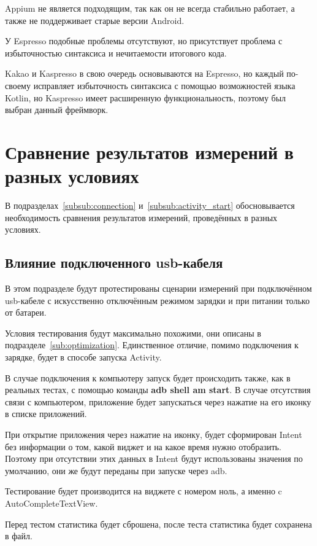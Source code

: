 \documentclass[a4paper,14pt]{extarticle} %
\begin{document}
	Appium не является подходящим, так как он не всегда стабильно работает, а также не поддерживает старые версии Android. 
	
	У Espresso подобные проблемы отсутствуют, но присутствует проблема с избыточностью синтаксиса и нечитаемости итогового кода. 
	
	Kakao и Kaspresso в свою очередь основываются на Espresso, но каждый по-своему исправляет избыточность синтаксиса с помощью возможностей языка Kotlin, но Kaspresso имеет расширенную функциональность, поэтому был выбран данный фреймворк.
	
	\clearpage
	\section{Сравнение результатов измерений в разных условиях}
	
	В подразделах~\ref{subsub:connection} и~\ref{subsub:activity_start} обосновывается необходимость сравнения результатов измерений, проведённых в разных условиях.
	
	\subsection{Влияние подключенного usb-кабеля}
	
	В этом подразделе будут протестированы сценарии измерений при подключённом usb-кабеле с искусственно отключённым режимом зарядки и при питании только от батареи.
	
	Условия тестирования будут максимально похожими, они описаны в подразделе~\ref{sub:optimization}. Единственное отличие, помимо подключения к зарядке, будет в способе запуска Activity. 
	
	В случае подключения к компьютеру запуск будет происходить также, как в реальных тестах, с помощью команды \textbf{adb shell am start}. В случае отсутствия связи с компьютером, приложение будет запускаться через нажатие на его иконку в списке приложений.
	
	При открытие приложения через нажатие на иконку, будет сформирован Intent без информации о том, какой виджет и на какое время нужно отобразить. Поэтому при отсутствии этих данных в Intent будут использованы значения по умолчанию, они же будут переданы при запуске через adb.
	
	Тестирование будет производится на виджете с номером ноль, а именно c AutoCompleteTextView.
	
	Перед тестом статистика будет сброшена, после теста статистика будет сохранена в файл.
\end{document}
